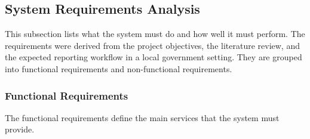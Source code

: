 \subsection{System Requirements Analysis}

This subsection lists what the system must do and how well it must perform. The requirements were derived from the project objectives, the literature review, and the expected reporting workflow in a local government setting. They are grouped into functional requirements and non-functional requirements.

\subsubsection*{Functional Requirements}

The functional requirements define the main services that the system must provide.

